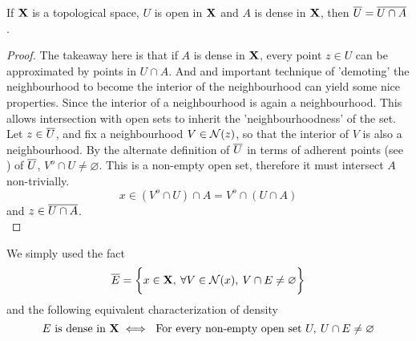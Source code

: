 \documentclass[../../main.tex]{subfiles}
\begin{document}
\begin{wts}
    If ${\mathbf{X}}$ is a topological space, $U$ is open in ${\mathbf{X}}$ and $A$ is dense in ${\mathbf{X}}$, then $\overline{U} = \overline{U\cap A}$.
\end{wts}
\begin{proof}
    The takeaway here is that if $A$ is dense in ${\mathbf{X}}$, every point $z\in U$ can be approximated by points in $U\cap A$. And and important technique of 'demoting' the neighbourhood to become the interior of the neighbourhood can yield some nice properties. Since the interior of a neighbourhood is again a neighbourhood. This allows intersection with open sets to inherit the 'neighbourhoodness' of the set.\\

    Let $z\in \overline{U}$, and fix a neighbourhood $V\in \mathcal{N}(z)$, so that the interior of $V$ is also a neighbourhood. By the alternate definition of $\overline{U}$ in terms of adherent points (see ) of $\overline{U}$, $V^o\cap U\neq\varnothing$. This is a non-empty open set, therefore it must intersect $A$ non-trivially.
    \[
        x\in (V^o\cap U)\cap A = V^o\cap (U\cap A)
    \]
    and $z\in \overline{U\cap A}$.\\
\end{proof}
\begin{remark}
We simply used the fact 
\[
\overline{E} = \biggl\{{x\in{\mathbf{X}},\: \forall V\in\mathcal{N}(x),\: V\cap E\neq\varnothing}\biggr\}
\]
and the following equivalent characterization of density
\[
E \text{ is dense in }{\mathbf{X}} \iff \text{ For every non-empty open set } U,\: U\cap E\neq\varnothing
\]
\end{remark}
\newpage
\end{document}
